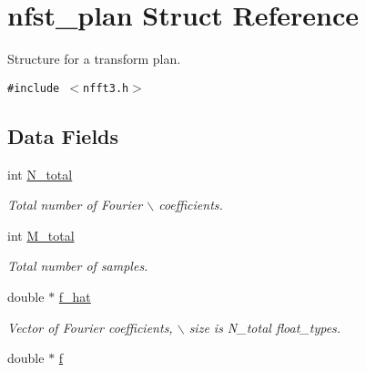 \hypertarget{structnfst__plan}{
\section{nfst\_\-plan Struct Reference}
\label{structnfst__plan}
}
Structure for a transform plan.  


{\tt \#include $<$nfft3.h$>$}

\subsection*{Data Fields}
\begin{CompactItemize}
\item 
\hypertarget{structnfst__plan_5622220bff0d3174b4dcae2a91313eed}{
int \hyperlink{structnfst__plan_5622220bff0d3174b4dcae2a91313eed}{N\_\-total}}
\label{structnfst__plan_5622220bff0d3174b4dcae2a91313eed}

\begin{CompactList}\small\item\em Total number of Fourier $\backslash$ coefficients. \item\end{CompactList}\item 
\hypertarget{structnfst__plan_3bf0f56c279404b80e795daf944d3d98}{
int \hyperlink{structnfst__plan_3bf0f56c279404b80e795daf944d3d98}{M\_\-total}}
\label{structnfst__plan_3bf0f56c279404b80e795daf944d3d98}

\begin{CompactList}\small\item\em Total number of samples. \item\end{CompactList}\item 
\hypertarget{structnfst__plan_8e7ed6ed137f58dea8f3871d959f8d9c}{
double $\ast$ \hyperlink{structnfst__plan_8e7ed6ed137f58dea8f3871d959f8d9c}{f\_\-hat}}
\label{structnfst__plan_8e7ed6ed137f58dea8f3871d959f8d9c}

\begin{CompactList}\small\item\em Vector of Fourier coefficients, $\backslash$ size is N\_\-total float\_\-types. \item\end{CompactList}\item 
\hypertarget{structnfst__plan_314e2d828775d6aa93a26d7c40b7b931}{
double $\ast$ \hyperlink{structnfst__plan_314e2d828775d6aa93a26d7c40b7b931}{f}}
\label{structnfst__plan_314e2d828775d6aa93a26d7c40b7b931}


\end{CompactItemize}
